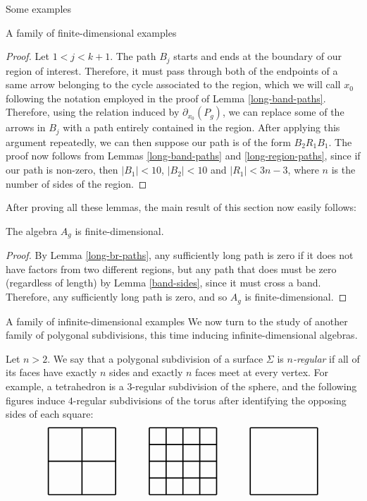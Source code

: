 \begin{chapter}{Some examples}
\begin{section}{A family of finite-dimensional examples}
\begin{proof}
Let $1<j<k+1$. The path $B_j$ starts and ends at the boundary of our region of interest. Therefore, it must pass through both of the endpoints of a same arrow belonging to the cycle associated to the region, which we will call $x_0$ following the notation employed in the proof of Lemma \ref{long-band-paths}. Therefore, using the relation induced by $\partial_{x_0}(P_g)$, we can replace some of the arrows in $B_j$ with a path entirely contained in the region.
After applying this argument repeatedly, we can then suppose our path is of the form $B_2 R_1 B_1$. The proof now follows from Lemmas \ref{long-band-paths} and \ref{long-region-paths}, since if our path is non-zero, then $|B_1|<10$, $|B_2|<10$ and $|R_1|<3n-3$, where $n$ is the number of sides of the region.
\end{proof}

After proving all these lemmas, the main result of this section now easily follows:

\begin{thm} The algebra $A_g$ is finite-dimensional.
\end{thm}
\begin{proof} By Lemma \ref{long-br-paths}, any sufficiently long path is zero if it does not have factors from two different regions, but any path that does must be zero (regardless of length) by Lemma \ref{band-sides}, since it must cross a band. Therefore, any sufficiently long path is zero, and so $A_g$ is finite-dimensional.
\end{proof}
\end{section}

\begin{section}{A family of infinite-dimensional examples}
We now turn to the study of another family of polygonal subdivisions, this time inducing infinite-dimensional algebras. 

Let $n>2$. We say that a polygonal subdivision of a surface $\Sigma$ is \emph{$n$-regular} if all of its faces have exactly $n$ sides and exactly $n$ faces meet at every vertex. For example, a tetrahedron is a $3$-regular subdivision of the sphere, and the following figures induce $4$-regular subdivisions of the torus after identifying the opposing sides of each square:
\[
\begin{tikzpicture}[scale=1.2, very thick]
\Square{-3}{0}
\Square{0}{0}
\Square{3}{0}
\draw (-3,-1) to (-3,1);
\draw (-4,0) to (-2,0);

\foreach \x in {-0.5,0,0.5}
{
\draw (\x, -1) to (\x, 1);
\draw (-1, \x) to (1, \x);
}


\end{tikzpicture}\]
\end{section}
\end{chapter}
